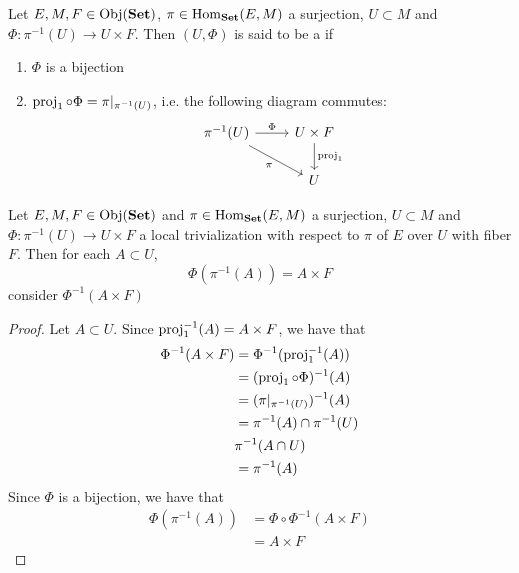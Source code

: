 \documentclass{book}
\begin{document}
	\begin{defn} 
		Let $E, M, F \in \operatorname{Obj}(\operatorname*{\text{\textbf{Set}}})$, $\pi \in \operatorname{Hom}_{\operatorname*{\text{\textbf{Set}}}}(E, M)$ a surjection, $U \subset M$ and $\Phi: \pi^{-1}(U) \rightarrow U \times F$. Then $(U, \Phi)$ is said to be a   if 
		\begin{enumerate}
			\item $\Phi$ is a bijection
			\item $\operatorname{\text{proj}}_1 \circ \Phi = \pi|_{\pi^{-1}(U)}$, i.e. the following diagram commutes:
			\[ 
			\begin{tikzcd}
				\pi^{-1}(U) \arrow[r, "\Phi"] \arrow[dr, "\pi"'] & U \times F \arrow[d, "\prj_1"]  \\
				& U
			\end{tikzcd}
			\]
		\end{enumerate}
	\end{defn}
	
	\begin{ex} 
		Let $E, M, F \in \operatorname{Obj}(\operatorname*{\text{\textbf{Set}}})$ and $\pi \in \operatorname{Hom}_{\operatorname*{\text{\textbf{Set}}}}(E, M)$ a surjection, $U \subset M$ and $\Phi: \pi^{-1}(U) \rightarrow U \times F$ a local trivialization with respect to $\pi$ of $E$ over $U$ with fiber $F$. Then for each $A \subset U$, $$\Phi( \pi^{-1}(A)) = A \times F$$
		 consider $\Phi^{-1}(A \times F)$ 
	\end{ex}
	
	\begin{proof}
		Let $A \subset U$. Since $\operatorname{\text{proj}}_1^{-1}(A) = A \times F$, we have that 
		\begin{align*}
			\Phi^{-1}(A \times F)
			& = \Phi^{-1}(\operatorname{\text{proj}}_1^{-1}(A)) \\
			& = (\operatorname{\text{proj}}_1 \circ \Phi)^{-1}(A) \\
			& = (\pi|_{\pi^{-1}(U)})^{-1}(A) \\
			& = \pi^{-1}(A) \cap \pi^{-1}(U) \\
			&  \pi^{-1}(A \cap U) \\
			& = \pi^{-1}(A)
		\end{align*}
		Since $\Phi$ is a bijection, we have that
		\begin{align*}
			\Phi (\pi^{-1}(A))
			&= \Phi \circ \Phi^{-1}(A \times F) \\
			&= A \times F
		\end{align*}
	\end{proof}
\end{document}
